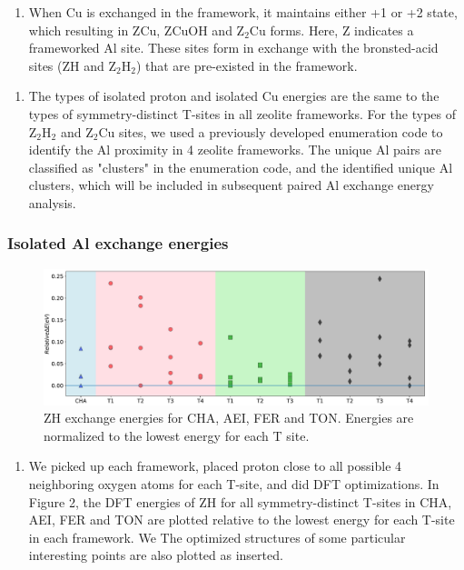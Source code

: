 \documentclass[12pt]{article}
\begin{document}
\begin{enumerate}[resume]
\item When Cu is exchanged in the framework, it maintains either +1 or +2 state, which resulting in ZCu, ZCuOH and Z$_{2}$Cu forms. Here, Z indicates a frameworked Al site. These sites form in exchange with the bronsted-acid sites (ZH and Z$_{2}$H$_{2}$) that are pre-existed in the framework.
\end{enumerate}

\begin{enumerate}[resume]
\item The types of isolated proton and isolated Cu energies are the same to the types of symmetry-distinct T-sites in all zeolite frameworks. For the types of Z$_{2}$H$_{2}$ and Z$_{2}$Cu sites, we used a previously developed enumeration code to identify the Al proximity in 4 zeolite frameworks.\cite{Paolucci2016} The unique Al pairs are classified as "clusters" in the enumeration code, and the identified unique Al clusters, which will be included in subsequent paired Al exchange energy analysis.
\end{enumerate}



\subsubsection*{Isolated Al exchange energies}
\begin{figure}[H]
\centering
  \includegraphics[width=5.2in]{./Figures/Figure-2}
  \caption{ZH exchange energies for CHA, AEI, FER and TON. Energies are normalized to the lowest energy for each T site.}
  \label{ZH energies}
\end{figure}

\begin{enumerate}
\item We picked up each framework, placed proton close to all possible 4 neighboring oxygen atoms for each T-site, and did DFT optimizations. In Figure 2, the DFT energies of ZH for all symmetry-distinct T-sites in CHA, AEI, FER and TON are plotted relative to the lowest energy for each T-site in each framework. We The optimized structures of some particular interesting points are also plotted as inserted.
\end{enumerate}
\end{document}

